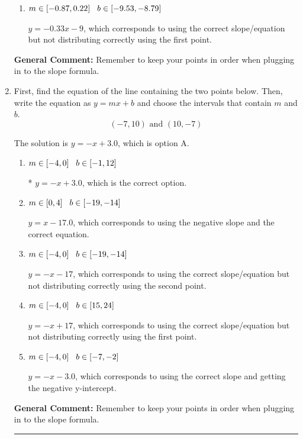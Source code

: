 \documentclass{extbook}[14pt]
\newcommand{\litem}[1]{\item #1

\rule{\textwidth}{0.4pt}}
\begin{document}
\begin{enumerate}
{\begin{enumerate}[label=\Alph*.]
 $y = 0.33x + 5.67$, which corresponds to using the negative slope and the correct equation.
\item \( m \in [-0.87, 0.22] \hspace*{3mm} b \in [-9.53, -8.79] \)

 $y = -0.33x -9$, which corresponds to using the correct slope/equation but not distributing correctly using the first point.
\end{enumerate}

\textbf{General Comment:} Remember to keep your points in order when plugging in to the slope formula.
}
\litem{
First, find the equation of the line containing the two points below. Then, write the equation as $ y=mx+b $ and choose the intervals that contain $m$ and $b$.
\[ (-7, 10) \text{ and } (10, -7) \]

The solution is \( y = -x + 3.0 \), which is option A.\begin{enumerate}[label=\Alph*.]
\item \( m \in [-4, 0] \hspace*{3mm} b \in [-1, 12] \)

* $y = -x + 3.0$, which is the correct option.
\item \( m \in [0, 4] \hspace*{3mm} b \in [-19, -14] \)

 $y = x -17.0$, which corresponds to using the negative slope and the correct equation.
\item \( m \in [-4, 0] \hspace*{3mm} b \in [-19, -14] \)

 $y = -x -17$, which corresponds to using the correct slope/equation but not distributing correctly using the second point.
\item \( m \in [-4, 0] \hspace*{3mm} b \in [15, 24] \)

 $y = -x + 17$, which corresponds to using the correct slope/equation but not distributing correctly using the first point.
\item \( m \in [-4, 0] \hspace*{3mm} b \in [-7, -2] \)

 $y = -x -3.0$, which corresponds to using the correct slope and getting the negative y-intercept.
\end{enumerate}

\textbf{General Comment:} Remember to keep your points in order when plugging in to the slope formula.
}
\end{enumerate}
\end{document}

